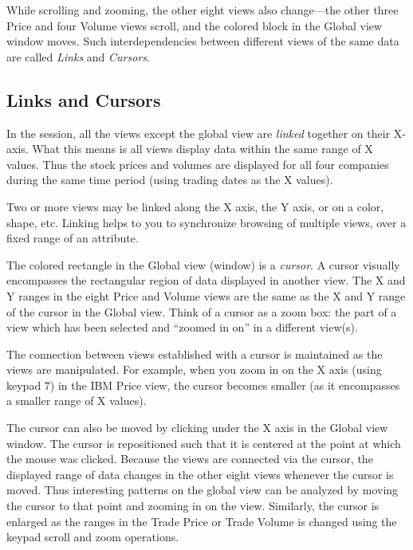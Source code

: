 While scrolling and zooming, the other eight views also change---the other three
Price and four Volume views scroll, and the colored block in the Global view
window moves. Such interdependencies between different views of the same data
are called {\em Links} and {\em Cursors}.


\subsection{Links and Cursors}

In the  session, all the views except the global view are {\em
linked} together on their X-axis. What this means is all views display data
within the same range of X values. Thus the stock prices and volumes are
displayed for all four companies during the same time period (using trading
dates as the X values).

Two or more views may be linked along the X axis, the Y axis, or on a color,
shape, etc. Linking helps to you to synchronize browsing of multiple views, over
a fixed range of an attribute.

The colored rectangle in the Global view (window) is a {\em cursor}. A cursor
visually encompasses the rectangular region of data displayed in another
view. The X and Y ranges in the eight Price and Volume views are the same as the
X and Y range of the cursor in the Global view. Think of a cursor as a zoom box:
the part of a view which has been selected and ``zoomed in on'' in a different
view(s).

The connection between views established with a cursor is maintained as the
views are manipulated. For example, when you zoom in on the X axis (using keypad
7) in the IBM Price view, the cursor becomes smaller (as it encompasses a
smaller range of X values).

The cursor can also be moved by clicking under the X axis in the Global view
window. The cursor is repositioned such that it is centered at the point at
which the mouse was clicked. Because the views are connected via the cursor, the
displayed range of data changes in the other eight views whenever the cursor is
moved. Thus interesting patterns on the global view can be analyzed by moving
the cursor to that point and zooming in on the view. Similarly, the cursor is
enlarged as the ranges in the Trade Price or Trade Volume is changed using the
keypad scroll and zoom operations.

